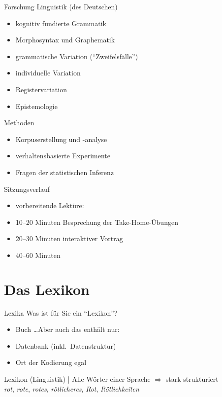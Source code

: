 \begin{frame}
  {Forschung}
  \onslide<+->
  \onslide<+->
  Linguistik (des Deutschen)\\
  \Halbzeile
  \begin{itemize}[<+->]
    \item kognitiv fundierte Grammatik
    \item Morphosyntax und Graphematik
    \item grammatische Variation ("`Zweifelsfälle"')
    \item individuelle Variation
    \item Registervariation
    \item Epistemologie
  \end{itemize}
  \Zeile
  \onslide<+->
  Methoden\\
  \Halbzeile
  \begin{itemize}[<+->]
    \item Korpuserstellung und -analyse
    \item verhaltensbasierte Experimente
    \item Fragen der statistischen Inferenz
  \end{itemize}
\end{frame}

\begin{frame}
  {Sitzungsverlauf}
  \onslide<+->
  \begin{itemize}[<+->]
    \item vorbereitende Lektüre: \citet{Schaefer2018b}
    \item 10--20 Minuten Besprechung der Take-Home-Übungen
    \item 20--30 Minuten interaktiver Vortrag
    \item 40--60 Minuten 
  \end{itemize}
\end{frame}

\section{Das Lexikon}

\begin{frame}
  {Lexika}
  \onslide<+->
  \onslide<+->
  Was ist für Sie ein "`Lexikon"'?\\
  \Zeile
  \onslide<+->
  \onslide<+->
  \begin{itemize}[<+->]
    \item Buch \onslide<+-> \ldots Aber auch das enthält nur:
    \item \alert{Datenbank} (inkl.\ Datenstruktur)
    \item Ort der Kodierung \alert{egal}
  \end{itemize}
  \onslide<+->
  \Zeile
  \alert{Lexikon (Linguistik) | Alle Wörter einer Sprache} \onslide<+-> \alert{$\Rightarrow$ stark strukturiert}\\
  \onslide<+->
  \textit{rot}, \textit{rote}, \textit{rotes}, \textit{rötlicheres}, \textit{Rot}, \textit{Rötlichkeiten}
\end{frame}

